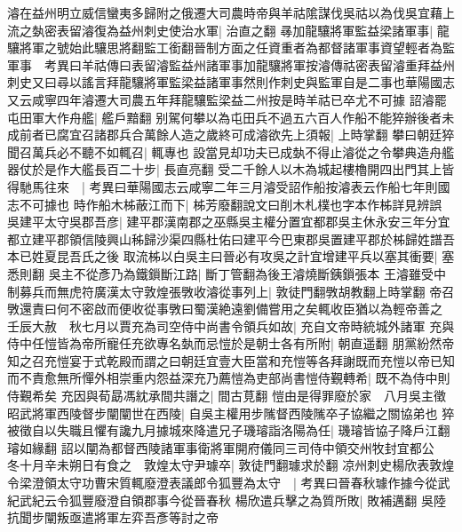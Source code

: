 濬在益州明立威信蠻夷多歸附之俄遷大司農時帝與羊祜隂謀伐吳祜以為伐吳宜藉上流之埶密表留濬復為益州刺史使治水軍|{
	治直之翻}
㝷加龍驤將軍監益梁諸軍事|{
	龍驤將軍之號始此驤思將翻監工銜翻晉制方面之任資重者為都督諸軍事資望輕者為監軍事　考異曰羊祜傳曰表留濬監益州諸軍事加龍驤將軍按濬傳祜密表留濬重拜益州刺史又曰尋以謠言拜龍驤將軍監梁益諸軍事然則作刺史與監軍自是二事也華陽國志又云咸寧四年濬遷大司農五年拜龍驤監梁益二州按是時羊祜已卒尤不可據}
詔濬罷屯田軍大作舟艦|{
	艦戶黯翻}
别駕何攀以為屯田兵不過五六百人作船不能猝辦後者未成前者已腐宜召諸郡兵合萬餘人造之歲終可成濬欲先上須報|{
	上時掌翻}
攀曰朝廷猝聞召萬兵必不聽不如輒召|{
	輒專也}
設當見却功夫已成埶不得止濬從之令攀典造舟艦器仗於是作大艦長百二十步|{
	長直亮翻}
受二千餘人以木為城起樓櫓開四出門其上皆得馳馬往來　|{
	考異曰華陽國志云咸寧二年三月濬受詔作船按濬表云作船七年則國志不可據也}
時作船木柹蔽江而下|{
	柹芳廢翻說文曰削木札樸也字本作柹詳見辨誤}
吳建平太守吳郡吾彦|{
	建平郡漢南郡之巫縣吳主權分置宜都郡吳主休永安三年分宜都立建平郡領信陵興山秭歸沙渠四縣杜佑曰建平今巴東郡吳置建平郡於柹歸姓譜吾本已姓夏昆吾氏之後}
取流柹以白吳主曰晉必有攻吳之計宜增建平兵以塞其衝要|{
	塞悉則翻}
吳主不從彥乃為鐵鎻斷江路|{
	斷丁管翻為後王濬燒斷銕鎻張本}
王濬雖受中制募兵而無虎符廣漢太守敦煌張斆收濬從事列上|{
	敦徒門翻斆胡教翻上時掌翻}
帝召斆還責曰何不密啟而便收從事斆曰蜀漢絶遠劉備嘗用之矣輒收臣猶以為輕帝善之　壬辰大赦　秋七月以賈充為司空侍中尚書令領兵如故|{
	充自文帝時統城外諸軍}
充與侍中任愷皆為帝所寵任充欲專名埶而忌愷於是朝士各有所附|{
	朝直遥翻}
朋黨紛然帝知之召充愷宴于式乾殿而謂之曰朝廷宜壹大臣當和充愷等各拜謝既而充愷以帝已知而不責愈無所憚外相崇重内怨益深充乃薦愷為吏部尚書愷侍覲轉希|{
	既不為侍中則侍覲希矣}
充因與荀勗馮紞承間共譖之|{
	間古莧翻}
愷由是得罪廢於家　八月吳主徵昭武將軍西陵督步闡闡世在西陵|{
	自吳主權用步隲督西陵隲卒子協繼之關協弟也}
猝被徵自以失職且懼有讒九月據城來降遣兄子璣璿詣洛陽為任|{
	璣璿皆協子降戶江翻璿如緣翻}
詔以闡為都督西陵諸軍事衛將軍開府儀同三司侍中領交州牧封宜都公　冬十月辛未朔日有食之　敦煌太守尹璩卒|{
	敦徒門翻璩求於翻}
凉州刺史楊欣表敦煌令梁澄領太守功曹宋質輒廢澄表議郎令狐豐為太守　|{
	考異曰晉春秋璩作據今從武紀武紀云令狐豐廢澄自領郡事今從晉春秋}
楊欣遣兵擊之為質所敗|{
	敗補邁翻}
吳陸抗聞步闡叛亟遣將軍左弈吾彥等討之帝

